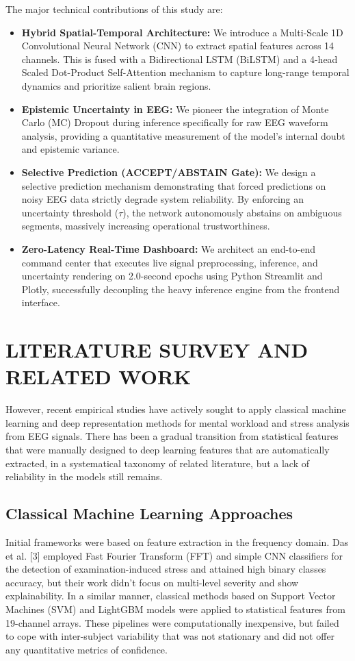 \documentclass[conference,a4paper]{IEEEtran}
\begin{document}
The major technical contributions of this study are:
\begin{itemize}
    \item \textbf{Hybrid Spatial-Temporal Architecture:} We introduce a Multi-Scale 1D Convolutional Neural Network (CNN) to extract spatial features across 14 channels. This is fused with a Bidirectional LSTM (BiLSTM) and a 4-head Scaled Dot-Product Self-Attention mechanism to capture long-range temporal dynamics and prioritize salient brain regions.
    \item \textbf{Epistemic Uncertainty in EEG:} We pioneer the integration of Monte Carlo (MC) Dropout during inference specifically for raw EEG waveform analysis, providing a quantitative measurement of the model's internal doubt and epistemic variance.
    \item \textbf{Selective Prediction (ACCEPT/ABSTAIN Gate):} We design a selective prediction mechanism demonstrating that forced predictions on noisy EEG data strictly degrade system reliability. By enforcing an uncertainty threshold ($\tau$), the network autonomously abstains on ambiguous segments, massively increasing operational trustworthiness.
    \item \textbf{Zero-Latency Real-Time Dashboard:} We architect an end-to-end command center that executes live signal preprocessing, inference, and uncertainty rendering on 2.0-second epochs using Python Streamlit and Plotly, successfully decoupling the heavy inference engine from the frontend interface.
\end{itemize}

\section{LITERATURE SURVEY AND RELATED WORK}
However, recent empirical studies have actively sought to apply classical machine learning and deep representation methods for mental workload and stress analysis from EEG signals. There has been a gradual transition from statistical features that were manually designed to deep learning features that are automatically extracted, in a systematical taxonomy of related literature, but a lack of reliability in the models still remains.

\subsection{Classical Machine Learning Approaches}
Initial frameworks were based on feature extraction in the frequency domain. Das et al. [3] employed Fast Fourier Transform (FFT) and simple CNN classifiers for the detection of examination-induced stress and attained high binary classes accuracy, but their work didn't focus on multi-level severity and show explainability. In a similar manner, classical methods based on Support Vector Machines (SVM) and LightGBM models were applied to statistical features from 19-channel arrays. These pipelines were computationally inexpensive, but failed to cope with inter-subject variability that was not stationary and did not offer any quantitative metrics of confidence.
\end{document}

